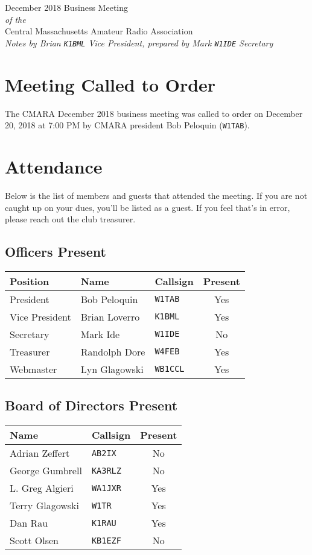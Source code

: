 \documentclass[10pt,letterpaper]{article}
\begin{document}
\begin{center}
{\huge December 2018 Business Meeting}\\
\emph{of the}\\
{\Large Central Massachusetts Amateur Radio Association}\\
\emph{Notes by Brian \texttt{K1BML} Vice President, prepared by Mark \texttt{W1IDE} Secretary}
\end{center}

\section{Meeting Called to Order}
The CMARA December 2018 business meeting was called to order on December 20, 2018 at 7:00 PM by CMARA president Bob Peloquin (\texttt{W1TAB}).

\section{Attendance}
\noindent
Below is the list of members and guests that attended the meeting. If you are not caught up on your dues, you'll be listed as a guest. If you feel that's in error, please reach out the club treasurer.

\subsection{Officers Present}
\begin{tabular}{|l|l|l|c|}
  \hline
  \textbf{Position} & \textbf{Name}  & \textbf{Callsign} & \textbf{Present} \\ \hline
  President         & Bob Peloquin   & \texttt{W1TAB}    & Yes \\
  Vice President    & Brian Loverro  & \texttt{K1BML}    & Yes \\
  Secretary         & Mark Ide       & \texttt{W1IDE}    & No  \\
  Treasurer         & Randolph Dore  & \texttt{W4FEB}    & Yes \\
  Webmaster         & Lyn Glagowski  & \texttt{WB1CCL}   & Yes \\
  \hline
\end{tabular}

\subsection{Board of Directors Present}
\begin{tabular}{|l|l|c|}
  \hline
  \textbf{Name}     & \textbf{Callsign} & \textbf{Present} \\ \hline
  Adrian Zeffert  & \texttt{AB2IX}    & No  \\
  George Gumbrell & \texttt{KA3RLZ}   & No  \\
  L. Greg Algieri & \texttt{WA1JXR}   & Yes \\
  Terry Glagowski & \texttt{W1TR}     & Yes \\
  Dan Rau         & \texttt{K1RAU}    & Yes \\
  Scott Olsen     & \texttt{KB1EZF}   & No  \\
  \hline
\end{tabular}
\end{document}
